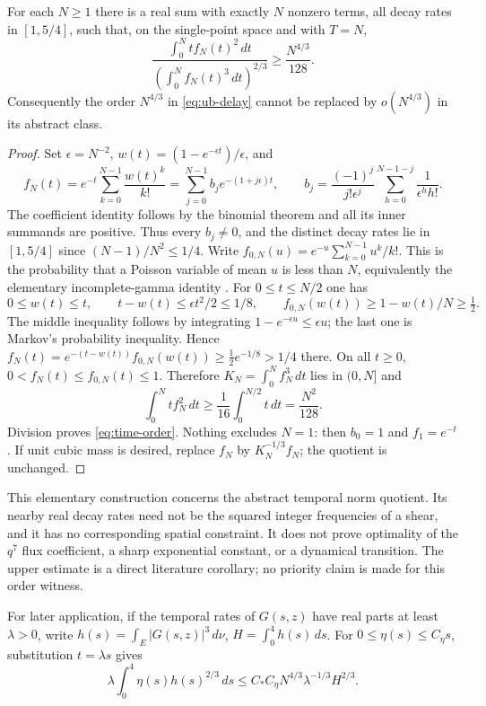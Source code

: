 \begin{proposition}\label{prop:time-order}
For each $N\ge1$ there is a real sum with exactly $N$ nonzero terms,
all decay rates in $[1,5/4]$, such that, on the single-point space and
with $T=N$,
\begin{equation}\label{eq:time-order}
 \frac{\int_0^N t f_N(t)^2\,dt}
 {\left(\int_0^N f_N(t)^3\,dt\right)^{2/3}}
 \ge\frac{N^{4/3}}{128}.
\end{equation}
Consequently the order $N^{4/3}$ in \eqref{eq:ub-delay} cannot be
replaced by $o(N^{4/3})$ in its abstract class.
\end{proposition}

\begin{proof}
Set $\epsilon=N^{-2}$, $w(t)=(1-e^{-\epsilon t})/\epsilon$, and
\[
 f_N(t)=e^{-t}\sum_{k=0}^{N-1}\frac{w(t)^k}{k!}
       =\sum_{j=0}^{N-1}b_je^{-(1+j\epsilon)t},\qquad
 b_j=\frac{(-1)^j}{j!\epsilon^j}
      \sum_{h=0}^{N-1-j}\frac1{\epsilon^h h!}.
\]
The coefficient identity follows by the binomial theorem and all its
inner summands are positive. Thus every $b_j\ne0$, and the distinct
decay rates lie in $[1,5/4]$ since $(N-1)/N^2\le1/4$.
Write $f_{0,N}(u)=e^{-u}\sum_{k=0}^{N-1}u^k/k!$.
This is the probability that a Poisson variable of mean $u$ is less
than $N$, equivalently the elementary incomplete-gamma identity
\cite[\S8.4.11]{DLMF}. For $0\le t\le N/2$ one has
\[
 0\le w(t)\le t,\qquad t-w(t)\le\epsilon t^2/2\le1/8,
 \qquad f_{0,N}(w(t))\ge1-w(t)/N\ge\tfrac12.
\]
The middle inequality follows by integrating
$1-e^{-\epsilon u}\le\epsilon u$; the last one is Markov's probability
inequality. Hence
$f_N(t)=e^{-(t-w(t))}f_{0,N}(w(t))\ge\tfrac12e^{-1/8}>1/4$ there.
On all $t\ge0$, $0<f_N(t)\le f_{0,N}(t)\le1$.
Therefore $K_N=\int_0^N f_N^3\,dt$ lies in $(0,N]$ and
\[
 \int_0^N t f_N^2\,dt\ge\frac1{16}\int_0^{N/2}t\,dt
 =\frac{N^2}{128}.
\]
Division proves \eqref{eq:time-order}. Nothing excludes $N=1$:
then $b_0=1$ and $f_1=e^{-t}$. If unit cubic mass is desired,
replace $f_N$ by $K_N^{-1/3}f_N$; the quotient is unchanged.
\end{proof}

This elementary construction concerns the abstract temporal norm quotient.
Its nearby real decay rates need not be the squared integer frequencies
of a shear, and it has no corresponding spatial constraint. It does not
prove optimality of the $q^7$ flux coefficient, a sharp exponential
constant, or a dynamical transition. The upper estimate is a direct
literature corollary; no priority claim is made for this order witness.

For later application, if the temporal rates of $G(s,z)$ have real
parts at least $\lambda>0$, write
$h(s)=\int_E|G(s,z)|^3\,d\nu$, $H=\int_0^4h(s)\,ds$.
For $0\le\eta(s)\le C_\eta s$, substitution $t=\lambda s$ gives
\begin{equation}\label{eq:ub-cutoff-time}
 \lambda\int_0^4\eta(s)h(s)^{2/3}\,ds
 \le C_* C_\eta N^{4/3}\lambda^{-1/3}H^{2/3}.
\end{equation}
